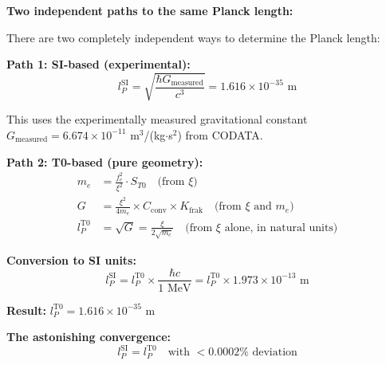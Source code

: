 \documentclass[12pt,a4paper]{article}
\begin{document}
	\begin{historical}
		\textbf{Two independent paths to the same Planck length:}
		
		There are two completely independent ways to determine the Planck length:
		
		\textbf{Path 1: SI-based (experimental):}
		\begin{equation}
			l_P^{\text{SI}} = \sqrt{\frac{\hbar G_{\text{measured}}}{c^3}} = 1.616 \times 10^{-35} \text{ m}
		\end{equation}
		
		This uses the experimentally measured gravitational constant $G_{\text{measured}} = 6.674 \times 10^{-11}$ m$^3$/(kg$\cdot$s$^2$) from CODATA.
		
		\textbf{Path 2: T0-based (pure geometry):}
		\begin{align}
			m_e &= \frac{f_e^2}{\xi^2} \cdot S_{T0} \quad \text{(from } \xi\text{)} \\
			G &= \frac{\xi^2}{4m_e} \times C_{\text{conv}} \times K_{\text{frak}} \quad \text{(from } \xi \text{ and } m_e\text{)} \\
			l_P^{\text{T0}} &= \sqrt{G} = \frac{\xi}{2\sqrt{m_e}} \quad \text{(from } \xi \text{ alone, in natural units)}
		\end{align}
		
		\textbf{Conversion to SI units:}
		\begin{equation}
			l_P^{\text{SI}} = l_P^{\text{T0}} \times \frac{\hbar c}{1 \text{ MeV}} = l_P^{\text{T0}} \times 1.973 \times 10^{-13} \text{ m}
		\end{equation}
		
		\textbf{Result:} $l_P^{\text{T0}} = 1.616 \times 10^{-35}$ m
		
		\textbf{The astonishing convergence:}
		\begin{equation}
			\boxed{l_P^{\text{SI}} = l_P^{\text{T0}} \quad \text{with } <0.0002\% \text{ deviation}}
		\end{equation}
	\end{historical}
	
\end{document}

